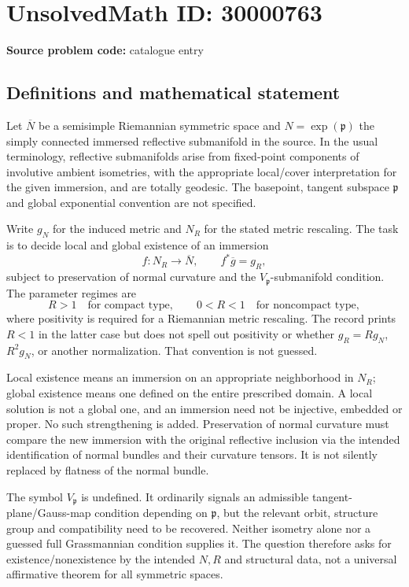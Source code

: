\documentclass[11pt]{article}
\begin{document}
\section*{UnsolvedMath ID: 30000763}
\textbf{Source problem code:} catalogue entry
\subsection{Definitions and mathematical statement}
Let \(\overline N\) be a semisimple Riemannian symmetric space and \(N=\exp(\mathfrak p)\) the simply connected immersed reflective submanifold in the source. In the usual terminology, reflective submanifolds arise from fixed-point components of involutive ambient isometries, with the appropriate local/cover interpretation for the given immersion, and are totally geodesic. The basepoint, tangent subspace \(\mathfrak p\) and global exponential convention are not specified.

Write \(g_N\) for the induced metric and \(N_R\) for the stated metric rescaling. The task is to decide local and global existence of an immersion
\[
 f:N_R\longrightarrow\overline N,\qquad f^*\overline g=g_R,
\]
subject to preservation of normal curvature and the \(V_{\mathfrak p}\)-submanifold condition. The parameter regimes are
\[
 R>1\quad\text{for compact type},\qquad
 0<R<1\quad\text{for noncompact type},
\]
where positivity is required for a Riemannian metric rescaling. The record prints \(R<1\) in the latter case but does not spell out positivity or whether \(g_R=R g_N\), \(R^2g_N\), or another normalization. That convention is not guessed.

Local existence means an immersion on an appropriate neighborhood in \(N_R\); global existence means one defined on the entire prescribed domain. A local solution is not a global one, and an immersion need not be injective, embedded or proper. No such strengthening is added. Preservation of normal curvature must compare the new immersion with the original reflective inclusion via the intended identification of normal bundles and their curvature tensors. It is not silently replaced by flatness of the normal bundle.

The symbol \(V_{\mathfrak p}\) is undefined. It ordinarily signals an admissible tangent-plane/Gauss-map condition depending on \(\mathfrak p\), but the relevant orbit, structure group and compatibility need to be recovered. Neither isometry alone nor a guessed full Grassmannian condition supplies it. The question therefore asks for existence/nonexistence by the intended \(N,R\) and structural data, not a universal affirmative theorem for all symmetric spaces.
\end{document}
